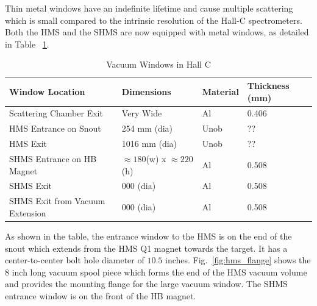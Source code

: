 {Thin metal windows have an indefinite lifetime and cause
multiple scattering which is small compared to the intrinsic resolution of
the Hall-C spectrometers. Both the HMS and the SHMS are now equipped
with metal windows, as detailed in Table ~\ref{tab:hall_c_windows_specs}.

\begin{table}
\begin{center}
\caption{Vacuum Windows in Hall C\label{tab:hall_c_windows_specs}}
\vspace{\baselineskip}
\begin{tabular}{|l|l|l|l|} 
\hline
Window Location				& Dimensions 	 	& Material & Thickness (mm) \\ \hline
Scattering Chamber Exit			& Very Wide		& Al		& 0.406\\
HMS Entrance	on Snout			& 254 mm (dia)		& Unob	& ??\\
HMS Exit						& 1016 mm (dia)	& Unob	& ??\\
SHMS Entrance on HB Magnet		& $\approx 180$(w) x $\approx 220$(h)		& Al	& 0.508\\
SHMS Exit					& 000 (dia)		& Al		& 0.508\\
SHMS Exit from Vacuum Extension	& 000 (dia)		& Al	& 0.508\\
\hline
\end{tabular}
\end{center}
\end{table}

As shown in the table, the entrance window to the HMS is on the end of the 
snout which extends from the HMS Q1 magnet towards the target.
It has  a center-to-center
bolt hole diameter of $10.5$ inches.  %
 Fig.~\ref{fig:hms_flange} shows
the 8 inch long vacuum spool piece which forms the end of the HMS vacuum
volume and provides the mounting flange for the large vacuum window. 
The SHMS
entrance window is on the front of the HB magnet.



}
